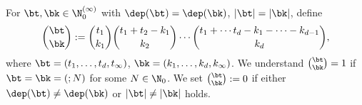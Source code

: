 \begin{Definition}
For $\bt,\bk\in  \N_0^{(\infty)}$ with $\dep(\bt)=\dep(\bk)$, 
$|\bt|=|\bk|$, define
\begin{equation} \label{ArrayBino}
\binom{\bt}{\bk}:=
\binom{t_1}{k_1}
\binom{t_1+t_2-k_1}{k_2}
\cdots
\binom{t_1+\cdots t_d-k_1-\cdots-k_{d-1}}{k_d},
\end{equation}
where $\bt=(t_1,\dots,t_d,t_\infty)$,
$\bk=(k_1,\dots,k_d,k_\infty)$.
We understand $\binom{\bt}{\bk}=1$ if
$\bt=\bk=(;N)$ for some $N\in \N_0$.
We set $\binom{\bt}{\bk}:=0$ if either $\dep(\bt)\ne\dep(\bk)$ or 
$|\bt|\ne|\bk|$ holds.
\end{Definition}
